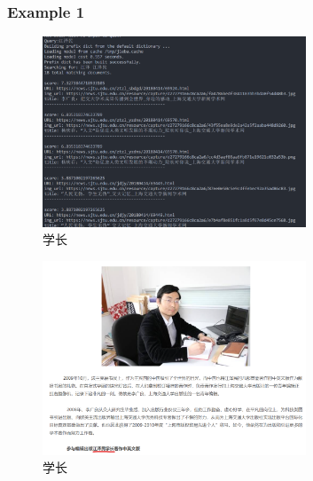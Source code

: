 \documentclass[12pt,a4paper]{article}
\begin{document}
\subsubsection{Example 1}
\begin{figure}[H]
	\includegraphics[width=0.7\textwidth]{q30.png}
	\centering
	 \caption{学长}
\end{figure}
\begin{figure}[H]
	\includegraphics[width=0.7\textwidth]{q31.png}
	\centering
	 \caption{学长}
\end{figure}
\end{document}
